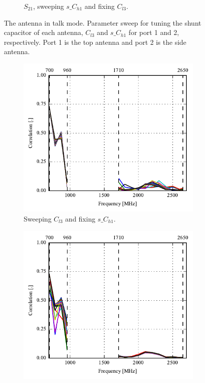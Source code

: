 \begin{figure}[htbp]
\begin{subfigure}[b]{0.49\linewidth}
        \caption{$S_{21}$, sweeping $s\_C_{h1}$ and fixing $C_{l3}$.}
    \end{subfigure}
    \caption{The antenna in talk mode. Parameter sweep for tuning the shunt capacitor of each antenna, $C_{l3}$ and $s\_C_{h1}$ for port 1 and 2, respectively. Port 1 is the top antenna and port 2 is the side antenna.}
    \label{fig:ant3_sparam_sweep_talk}
\end{figure}

\begin{figure}[htbp]
    \centering
    \begin{subfigure}{0.49\linewidth}
        \includegraphics{img/tech_sol/nonresonant/simulation/talk_mode/sweep_top_corr}
        \caption{Sweeping $C_{l3}$ and fixing $s\_C_{h1}$.}
    \end{subfigure}
    \hfill
    \begin{subfigure}{0.49\linewidth}
        \includegraphics{img/tech_sol/nonresonant/simulation/talk_mode/sweep_side_corr}

\end{subfigure}
\end{figure}
